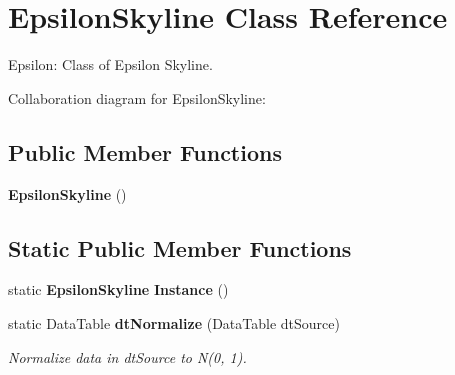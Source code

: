 \section{Epsilon\-Skyline Class Reference}
\label{class_epsilon_skyline}
Epsilon: Class of Epsilon Skyline.  


Collaboration diagram for Epsilon\-Skyline:\subsection*{Public Member Functions}
\begin{CompactItemize}
\item 
{\bf Epsilon\-Skyline} ()
\end{CompactItemize}
\subsection*{Static Public Member Functions}
\begin{CompactItemize}
\item 
static {\bf Epsilon\-Skyline} {\bf Instance} ()
\item 
static Data\-Table {\bf dt\-Normalize} (Data\-Table dt\-Source)
\begin{CompactList}\small\item\em Normalize data in dt\-Source to N(0, 1). \item\end{CompactList}\end{CompactItemize}
